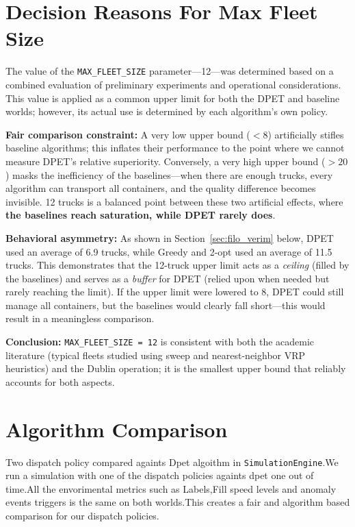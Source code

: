 \documentclass[12pt,a4paper]{report}
\begin{document}
\section{Decision Reasons For Max Fleet Size}
\label{sec:filo_secimi}

\indent The value of the \texttt{MAX\_FLEET\_SIZE} parameter—12—was determined based on a combined evaluation of preliminary experiments and operational considerations. This value is applied as a common upper limit for both the DPET and baseline worlds; however, its actual use is determined by each algorithm’s own policy.

\indent \textbf{Fair comparison constraint:} A very low upper bound (\(<8\)) artificially stifles baseline algorithms; this inflates their performance to the point where we cannot measure DPET’s relative superiority. Conversely, a very high upper bound (\(>20\)) masks the inefficiency of the baselines—when there are enough trucks, every algorithm can transport all containers, and the quality difference becomes invisible. 12 trucks is a balanced point between these two artificial effects, where \textbf{the baselines reach saturation, while DPET rarely does}.

\indent \textbf{Behavioral asymmetry:} As shown in Section~\ref{sec:filo_verim} below, DPET used an average of 6.9 trucks, while Greedy and 2-opt used an average of 11.5 trucks. This demonstrates that the 12-truck upper limit acts as a \textit{ceiling} (filled by the baselines) and serves as a \textit{buffer} for DPET (relied upon when needed but rarely reaching the limit). If the upper limit were lowered to 8, DPET could still manage all containers, but the baselines would clearly fall short—this would result in a meaningless comparison.

\indent \textbf{Conclusion:} \texttt{MAX\_FLEET\_SIZE = 12} is consistent with both the academic literature (typical fleets studied using sweep and nearest-neighbor VRP heuristics) and the Dublin operation; it is the smallest upper bound that reliably accounts for both aspects.

\section{Algorithm Comparison}
\label{sec:algoritmalar}

\indent Two dispatch policy  compared againts Dpet algoithm in \texttt{SimulationEngine}.We run a simulation with one of the dispatch policies againts dpet one out of time.All the envorimental metrics such as Labels,Fill speed levels and anomaly events triggers is the same on both worlds.This creates a fair and algorithm based comparison for our dispatch policies.
\end{document}
